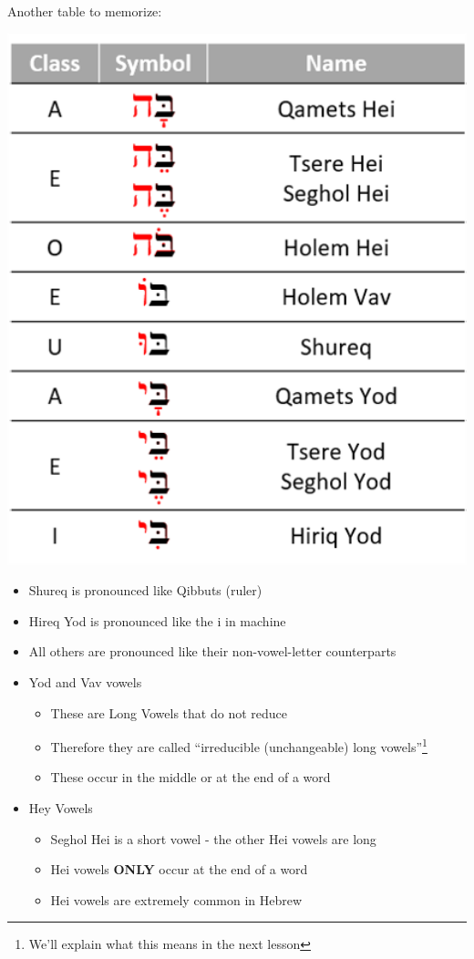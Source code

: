 \documentclass[
]{turabian-researchpaper}
\providecommand{\tightlist}{%
  \setlength{\itemsep}{0pt}\setlength{\parskip}{0pt}}
\begin{document}
Another table to memorize:

\begin{center}\includegraphics[width=500pt]{images/02.vowels_letters} \end{center}

\begin{itemize}
\tightlist
\item
  Shureq is pronounced like Qibbuts (ruler)
\item
  Hireq Yod is pronounced like the i in machine
\item
  All others are pronounced like their non-vowel-letter counterparts
\item
  Yod and Vav vowels

  \begin{itemize}
  \tightlist
  \item
    These are Long Vowels that do not reduce
  \item
    Therefore they are called ``irreducible (unchangeable) long vowels''\footnote{We'll explain what this means in the next lesson}
  \item
    These occur in the middle or at the end of a word
  \end{itemize}
\item
  Hey Vowels

  \begin{itemize}
  \tightlist
  \item
    Seghol Hei is a short vowel - the other Hei vowels are long
  \item
    Hei vowels \textbf{ONLY} occur at the end of a word
  \item
    Hei vowels are extremely common in Hebrew
  \end{itemize}
\end{itemize}
\end{document}
